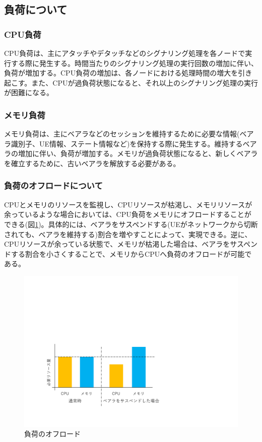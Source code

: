 \documentclass[a4j]{ujarticle}
\begin{document}
\subsection{負荷について}
\subsubsection{CPU負荷}
CPU負荷は、主にアタッチやデタッチなどのシグナリング処理を各ノードで実行する際に発生する。時間当たりのシグナリング処理の実行回数の増加に伴い、負荷が増加する。CPU負荷の増加は、各ノードにおける処理時間の増大を引き起こす。また、CPUが過負荷状態になると、それ以上のシグナリング処理の実行が困難になる。
\subsubsection{メモリ負荷}
メモリ負荷は、主にベアラなどのセッションを維持するために必要な情報(ベアラ識別子、UE情報、ステート情報など)を保持する際に発生する。維持するベアラの増加に伴い、負荷が増加する。メモリが過負荷状態になると、新しくベアラを確立するために、古いベアラを解放する必要がある。
\subsubsection{負荷のオフロードについて}
CPUとメモリのリソースを監視し、CPUリソースが枯渇し、メモリリソースが余っているような場合においては、CPU負荷をメモリにオフロードすることができる(図\ref{グラフ})。具体的には、ベアラをサスペンドする(UEがネットワークから切断されても、ベアラを維持する)割合を増やすことによって、実現できる。逆に、CPUリソースが余っている状態で、メモリが枯渇した場合は、ベアラをサスペンドする割合を小さくすることで、メモリからCPUへ負荷のオフロードが可能である。
\begin{figure}[htbp]
	\centering
	\includegraphics[width=0.7\hsize]{グラフ.pdf}
  \caption{負荷のオフロード}
	\label{グラフ}
\end{figure}
\end{document}

